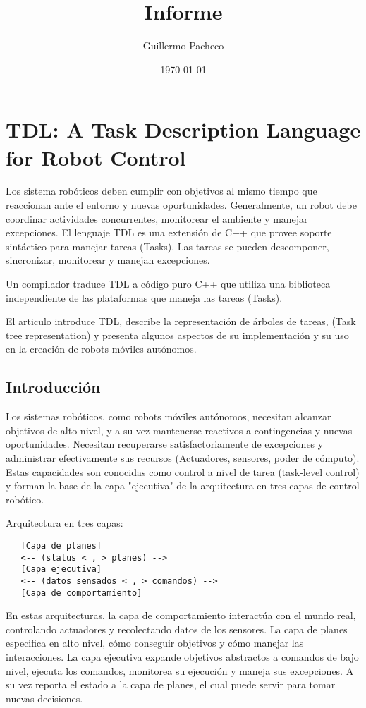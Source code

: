 \documentclass[a4paper, 11pt, oneside]{article}
\title{Informe}
\author{Guillermo Pacheco}
\date{\today}
\begin{document}
\maketitle


\section{TDL: A Task Description Language for Robot Control}

Los sistema robóticos deben cumplir con objetivos al mismo tiempo que
reaccionan ante el entorno y nuevas oportunidades.
Generalmente, un robot debe coordinar actividades concurrentes, monitorear el 
ambiente y manejar excepciones.
El lenguaje TDL es una extensión de C++ que provee soporte sintáctico para 
manejar tareas (Tasks).
Las tareas se pueden descomponer, sincronizar,
monitorear y manejan excepciones.

Un compilador traduce TDL a código puro C++ que utiliza una biblioteca 
independiente de las plataformas que maneja las tareas (Tasks).

El articulo introduce TDL, describe la representación de árboles de tareas, 
(Task tree representation) y presenta algunos aspectos de su implementación 
y su uso en la creación de robots móviles autónomos.

\subsection{Introducción}

Los sistemas robóticos, como robots móviles autónomos, necesitan alcanzar
objetivos de alto nivel, y a su vez mantenerse reactivos a contingencias y
nuevas oportunidades.
Necesitan recuperarse satisfactoriamente de excepciones y administrar
efectivamente sus recursos (Actuadores, sensores, poder de cómputo).
Estas capacidades son conocidas como control a nivel de tarea
(task-level control) y forman la base de la capa "ejecutiva" de la 
arquitectura en tres capas de control robótico.

Arquitectura en tres capas:

\begin{verbatim}
   [Capa de planes]
   <-- (status < , > planes) -->
   [Capa ejecutiva]
   <-- (datos sensados < , > comandos) -->
   [Capa de comportamiento]
\end{verbatim}


En estas arquitecturas, la capa de comportamiento interactúa con el mundo real,
controlando actuadores y recolectando datos de los sensores.
La capa de planes especifica en alto nivel, cómo conseguir objetivos y
cómo manejar las interacciones.
La capa ejecutiva expande objetivos abstractos a comandos de bajo nivel,
ejecuta los comandos, monitorea su ejecución y maneja sus excepciones.
A su vez reporta el estado a la capa de planes, el cual puede servir para tomar
nuevas decisiones.
\end{document}
